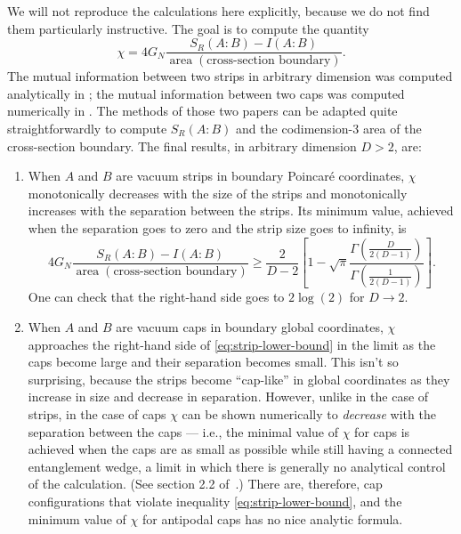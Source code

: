 \documentclass[a4paper,11pt]{article}
\newcommand{\area}{\operatorname{area}}
\begin{document}
We will not reproduce the calculations here explicitly, because we do not find them particularly instructive. The goal is to compute the quantity
\begin{equation}
    \chi = 4 G_N \frac{S_R(A:B) - I(A:B)}{\area(\text{cross-section boundary})}.
\end{equation}
The mutual information between two strips in arbitrary dimension was computed analytically in \cite{fischler2013holographic}; the mutual information between two caps was computed numerically in \cite{colin2020large}. The methods of those two papers can be adapted quite straightforwardly to compute $S_R(A:B)$ and the codimension-3 area of the cross-section boundary. The final results, in arbitrary dimension $D>2$, are:
\begin{enumerate}
    \item When $A$ and $B$ are vacuum strips in boundary Poincar\'{e} coordinates, $\chi$ monotonically decreases with the size of the strips and monotonically increases with the separation between the strips. Its minimum value, achieved when the separation goes to zero and the strip size goes to infinity, is
    \begin{equation} \label{eq:strip-lower-bound}
        4 G_N \frac{S_R(A:B) - I(A:B)}{\area(\text{cross-section boundary})}
            \geq \frac{2}{D-2} \left[ 1 - \sqrt{\pi} \frac{\Gamma\left(\frac{D}{2(D-1)}\right)}{\Gamma\left(\frac{1}{2(D-1)}\right)}\right].
    \end{equation}
    One can check that the right-hand side goes to $2 \log(2)$ for $D \rightarrow 2.$
    
    \item When $A$ and $B$ are vacuum caps in boundary global coordinates, $\chi$ approaches the right-hand side of \eqref{eq:strip-lower-bound} in the limit as the caps become large and their separation becomes small. This isn't so surprising, because the strips become ``cap-like'' in global coordinates as they increase in size and decrease in separation. However, unlike in the case of strips, in the case of caps $\chi$ can be shown numerically to \emph{decrease} with the separation between the caps --- i.e., the minimal value of $\chi$ for caps is achieved when the caps are as small as possible while still having a connected entanglement wedge, a limit in which there is generally no analytical control of the calculation. (See section 2.2 of~\cite{colin2020large}.) There are, therefore, cap configurations that violate inequality \eqref{eq:strip-lower-bound}, and the minimum value of $\chi$ for antipodal caps has no nice analytic formula.
\end{enumerate}
\end{document}
